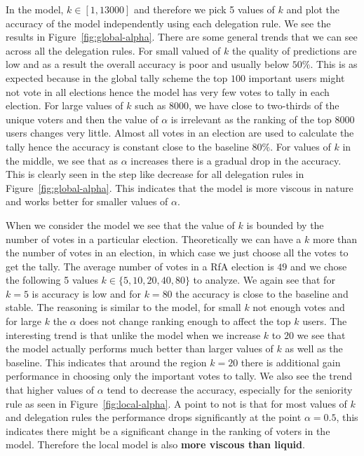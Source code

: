 In the \globalv model, $k \in [1,13000]$ and therefore we pick 5 values of $k$ and plot the accuracy of the model independently using each delegation rule. We see the results in Figure~\ref{fig:global-alpha}. There are some general trends that we can see across all the delegation rules. For small valued of $k$ the quality of predictions are low and as a result the overall accuracy is poor and usually below $50\%$. This is as expected because in the global tally scheme the top $100$ important users might not vote in all elections hence the model has very few votes to tally in each election. For large values of $k$ such as $8000$, we have close to two-thirds of the unique voters and then the value of $\alpha$ is irrelevant as the ranking of the top $8000$ users changes very little. Almost all votes in an election are used to calculate the tally hence the accuracy is constant close to the baseline $80\%$. For values of $k$ in the middle, we see that as $\alpha$ increases there is a gradual drop in the accuracy. This is clearly seen in the step like decrease for all delegation rules in Figure~\ref{fig:global-alpha}. This indicates that the \globalv model is more viscous in nature and works better for smaller values of $\alpha$.
\smallskip

When we consider the \localv model we see that the value of $k$ is bounded by the number of votes in a particular election. Theoretically we can have a $k$ more than the number of votes in an election, in which case we just choose all the votes to get the tally. The average number of votes in a RfA election is $49$ and we chose the following 5 values $k \in \{5,10,20,40,80\}$ to analyze. We again see that for $k=5$ is accuracy is low and for $k=80$ the accuracy is close to the baseline and stable. The reasoning is similar to the \globalv model, for small $k$ not enough votes and for large $k$ the $\alpha$ does not change ranking enough to affect the top $k$ users. The interesting trend is that unlike the \globalv model when we increase $k$ to $20$ we see that the \localv model actually performs much better than larger values of $k$ as well as the baseline. This indicates that around the region $k=20$ there is additional gain performance in choosing only the important votes to tally. We also see the trend that higher values of $\alpha$ tend to decrease the accuracy, especially for the seniority rule as seen in Figure~\ref{fig:local-alpha}. A point to not is that for most values of $k$ and delegation rules the performance drops significantly at the point $\alpha=0.5$, this indicates there might be a significant change in the ranking of voters in the \localv model. Therefore the local model is also \textbf{more viscous than liquid}.

